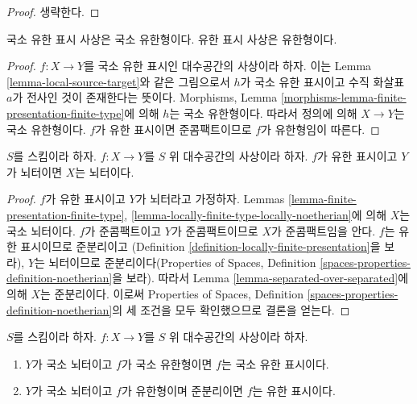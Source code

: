 \begin{proof}
생략한다.
\end{proof}

\begin{lemma}
\label{lemma-finite-presentation-finite-type}
국소 유한 표시 사상은 국소 유한형이다.
유한 표시 사상은 유한형이다.
\end{lemma}

\begin{proof}
$f : X \to Y$를 국소 유한 표시인 대수공간의 사상이라 하자.
이는 Lemma \ref{lemma-local-source-target}와 같은 그림으로서
$h$가 국소 유한 표시이고 수직 화살표 $a$가 전사인 것이
존재한다는 뜻이다. Morphisms, Lemma
\ref{morphisms-lemma-finite-presentation-finite-type}에 의해
$h$는 국소 유한형이다.
따라서 정의에 의해 $X \to Y$는 국소 유한형이다.
$f$가 유한 표시이면 준콤팩트이므로 $f$가 유한형임이 따른다.
\end{proof}

\begin{lemma}
\label{lemma-finite-presentation-noetherian}
$S$를 스킴이라 하자.
$f : X \to Y$를 $S$ 위 대수공간의 사상이라 하자.
$f$가 유한 표시이고 $Y$가 뇌터이면 $X$는 뇌터이다.
\end{lemma}

\begin{proof}
$f$가 유한 표시이고 $Y$가 뇌터라고 가정하자.
Lemmas \ref{lemma-finite-presentation-finite-type},
\ref{lemma-locally-finite-type-locally-noetherian}에 의해
$X$는 국소 뇌터이다. $f$가 준콤팩트이고 $Y$가 준콤팩트이므로
$X$가 준콤팩트임을 안다. $f$는 유한 표시이므로 준분리이고
(Definition \ref{definition-locally-finite-presentation}을 보라),
$Y$는 뇌터이므로 준분리이다(Properties of Spaces, Definition
\ref{spaces-properties-definition-noetherian}을 보라).
따라서 Lemma \ref{lemma-separated-over-separated}에 의해
$X$는 준분리이다. 이로써 Properties of Spaces, Definition
\ref{spaces-properties-definition-noetherian}의 세 조건을 모두
확인했으므로 결론을 얻는다.
\end{proof}

\begin{lemma}
\label{lemma-noetherian-finite-type-finite-presentation}
$S$를 스킴이라 하자.
$f : X \to Y$를 $S$ 위 대수공간의 사상이라 하자.
\begin{enumerate}
\item $Y$가 국소 뇌터이고 $f$가 국소 유한형이면
$f$는 국소 유한 표시이다.
\item $Y$가 국소 뇌터이고 $f$가 유한형이며 준분리이면
$f$는 유한 표시이다.
\end{enumerate}
\end{lemma}

